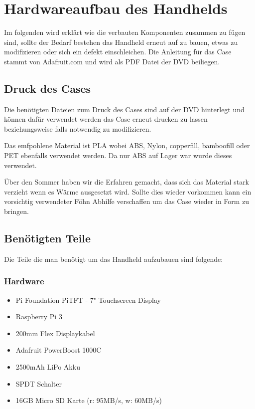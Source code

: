%
%

\chapter{Hardwareaufbau des Handhelds}

Im folgenden wird erklärt wie die verbauten Komponenten zusammen zu fügen sind, sollte der Bedarf bestehen das Handheld erneut auf zu bauen, etwas zu modifizieren oder sich ein defekt einschleichen. Die Anleitung für das Case stammt von Adafruit.com und wird als PDF Datei der DVD beiliegen. 

\section{Druck des Cases}

Die benötigten Dateien zum Druck des Cases sind auf der DVD hinterlegt und können dafür verwendet werden das Case erneut drucken zu lassen beziehungsweise falls notwendig zu modifizieren. 

Das emfpohlene Material ist PLA wobei ABS, Nylon, copperfill, bamboofill oder PET ebenfalls verwendet werden. Da nur ABS auf Lager war wurde dieses verwendet. 

Über den Sommer haben wir die Erfahren gemacht, dass sich das Material stark verzieht wenn es Wärme ausgesetzt wird. Sollte dies wieder vorkommen kann ein vorsichtig verwendeter Föhn Abhilfe verschaffen um das Case wieder in Form zu bringen. 

\section{Benötigten Teile}
Die Teile die man benötigt um das Handheld aufzubauen sind folgende:

\subsection{Hardware}
\begin{itemize}
\item Pi Foundation PiTFT - 7" Touchscreen Display 
\item Raspberry Pi 3 
\item 200mm Flex Displaykabel
\item Adafruit PowerBoost 1000C
\item 2500mAh LiPo Akku
\item SPDT Schalter
\item 16GB  Micro SD Karte (r: 95MB/s, w: 60MB/s)
\end{itemize} 

